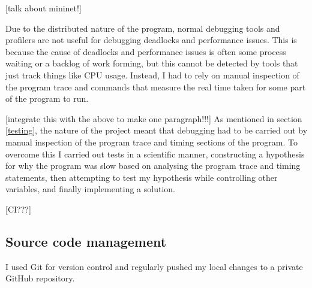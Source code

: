 [talk about mininet!] \cite{noauthor_mininet_nodate}

Due to the distributed nature of the program, normal debugging tools and profilers are not useful for debugging deadlocks and performance issues. This is because the cause of deadlocks and performance issues is often some process waiting or a backlog of work forming, but this cannot be detected by tools that just track things like CPU usage. Instead, I had to rely on manual inspection of the program trace and commands that measure the real time taken for some part of the program to run.

[integrate this with the above to make one paragraph!!!]
As mentioned in section \ref{testing}, the nature of the project meant that debugging had to be carried out by manual inspection of the program trace and timing sections of the program. To overcome this I carried out tests in a scientific manner, constructing a hypothesis for why the program was slow based on analysing the program trace and timing statements, then attempting to test my hypothesis while controlling other variables, and finally implementing a solution.

[CI???]

\subsection{Source code management}

I used Git for version control and regularly pushed my local changes to a private GitHub repository.